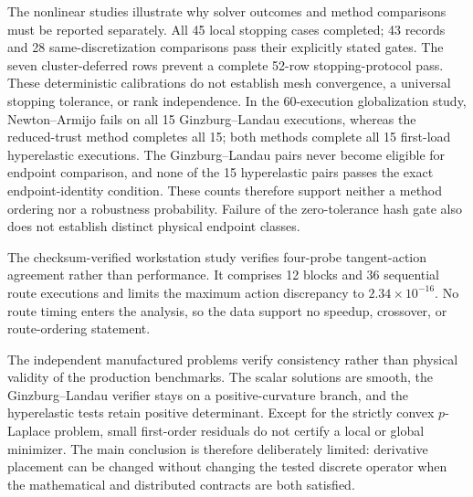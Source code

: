 The nonlinear studies illustrate why solver outcomes and method comparisons
must be reported separately. All 45 local stopping cases completed; 43 records
and 28 same-discretization comparisons pass their explicitly stated gates. The
seven cluster-deferred rows prevent a complete 52-row stopping-protocol pass.
These deterministic calibrations do not establish mesh convergence, a universal
stopping tolerance, or rank independence. In the 60-execution
globalization study, Newton--Armijo fails on all 15 Ginzburg--Landau
executions, whereas the reduced-trust method completes all 15; both methods
complete all 15 first-load hyperelastic executions. The Ginzburg--Landau pairs
never become eligible for endpoint comparison, and none of the 15
hyperelastic pairs passes the exact endpoint-identity condition. These counts
therefore support neither a method ordering nor a robustness probability.
Failure of the zero-tolerance hash gate also does not establish distinct
physical endpoint classes.

The checksum-verified workstation study verifies four-probe tangent-action
agreement rather than performance. It comprises 12 blocks and 36 sequential
route executions and limits the maximum action discrepancy to
$2.34\times10^{-16}$. No route timing enters the analysis, so the data support
no speedup, crossover, or route-ordering statement.

The independent manufactured problems verify consistency rather than physical
validity of the production benchmarks. The scalar solutions are smooth, the
Ginzburg--Landau verifier stays on a positive-curvature branch, and the
hyperelastic tests retain positive determinant. Except for the strictly convex
$p$-Laplace problem, small first-order residuals do not certify a local or
global minimizer. The main conclusion is therefore deliberately limited:
derivative placement can be changed without changing the tested discrete
operator when the mathematical and distributed contracts are both satisfied.
